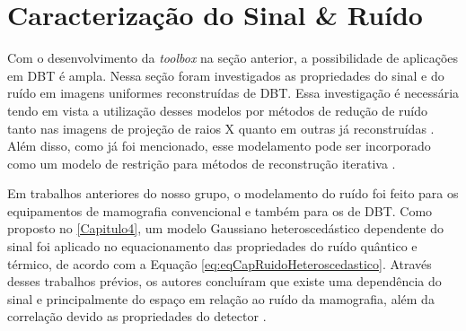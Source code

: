 %
%
%
%
%

\section{Caracterização do Sinal  \& Ruído}

Com o desenvolvimento da \textit{toolbox} na seção anterior, a possibilidade de aplicações em \acs{DBT} é ampla. Nessa seção foram investigados as propriedades do sinal e do ruído em imagens uniformes reconstruídas de \acs{DBT}. Essa investigação é necessária tendo em vista a utilização desses modelos por métodos de redução de ruído tanto nas imagens de projeção de raios X quanto em outras já reconstruídas \cite{wu2012dose, borges2017pipeline}. Além disso, como já foi mencionado, esse modelamento pode ser incorporado como um modelo de restrição para métodos de reconstrução iterativa \cite{zheng2018detector}. 

Em trabalhos anteriores do nosso grupo, o modelamento do ruído foi feito para os equipamentos de mamografia convencional e também para os de \acs{DBT}. Como proposto no \autoref{Capitulo4}, um modelo  Gaussiano heteroscedástico dependente do sinal foi aplicado no equacionamento das propriedades do ruído quântico e térmico, de acordo com a Equação \ref{eq:eqCapRuidoHeteroscedastico}.  Através desses trabalhos prévios, os autores concluíram que existe uma dependência do sinal e principalmente do espaço em relação ao ruído da mamografia, além da correlação devido as propriedades do detector \cite{borges2017pipeline,borges2017method, borges2018restoration,brito2018application,guerrero2018}. 

